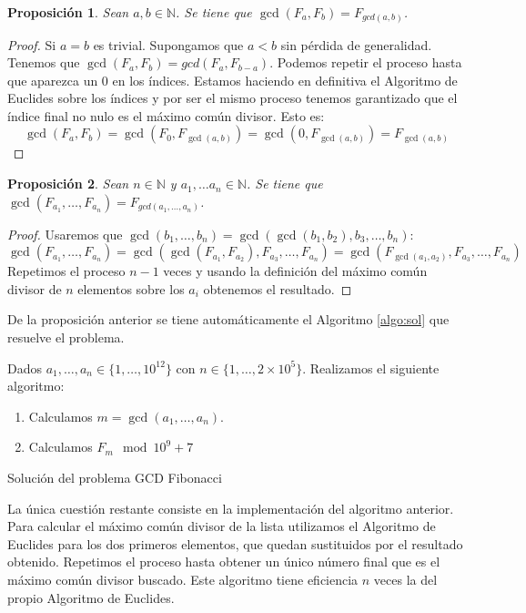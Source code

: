 \documentclass{article}
\theoremstyle{theorem-style}  %
\newtheorem{proposition}{Proposición}
\theoremstyle{definition}
\theoremstyle{example-style}
\begin{document}
    \begin{proposition}
        Sean $a, b \in \mathbb{N}$. Se tiene que $\gcd(F_a, F_b) = F_{gcd(a, b)}$. 
    \end{proposition}
    \begin{proof}
        Si $a=b$ es trivial. Supongamos que $a < b$ sin pérdida de generalidad.
        Tenemos que $\gcd(F_a, F_b) = gcd(F_a, F_{b-a})$. Podemos repetir el proceso hasta que aparezca un 0 en los índices. Estamos haciendo en definitiva el Algoritmo de Euclides sobre los índices y por ser el mismo proceso tenemos garantizado que el índice final no nulo es el máximo común divisor. Esto es:
        $$ \gcd(F_a, F_b) = \gcd(F_0, F_{\gcd(a,b)}) = \gcd(0, F_{\gcd(a,b)}) = F_{\gcd(a,b)} $$
    \end{proof}
    
    \begin{proposition}
        Sean $n \in \mathbb{N}$ y $a_1, \dots a_n \in \mathbb{N}$. Se tiene que 
        $\gcd(F_{a_1}, \dots, F_{a_n}) = F_{gcd(a_1, \dots, a_n)}$. 
    \end{proposition}
    \begin{proof}
        Usaremos que $\gcd(b_1, \dots, b_n) = \gcd( \gcd(b_1, b_2), b_3, \dots, b_n)$:
        $$ \gcd(F_{a_1}, \dots, F_{a_n}) = \gcd(\gcd(F_{a_1},F_{a_2}), F_{a_3}, \dots, F_{a_n}) = \gcd(F_{\gcd(a_1, a_2)}, F_{a_3}, \dots, F_{a_n}) $$
        Repetimos el proceso $n-1$ veces y usando la definición del máximo común divisor de $n$ elementos sobre los $a_i$ obtenemos el resultado.
    \end{proof}

    De la proposición anterior se tiene automáticamente el Algoritmo \ref{algo:sol} que resuelve el problema.
    
    \begin{algorithm}
        Dados $a_1, \dots, a_n \in \{1, \dots, 10^{12}\}$ con $n \in \{1, \dots, 2\times10^5\}$. Realizamos el siguiente algoritmo:
        \begin{enumerate}
            \item Calculamos $m = \gcd(a_1, \dots, a_n)$.
            \item Calculamos $F_m \mod 10^9+7$
        \end{enumerate}
        \caption{Solución del problema GCD Fibonacci}
        \label{algo:sol}
    \end{algorithm}

    La única cuestión restante consiste en la implementación del algoritmo anterior. Para calcular el máximo común divisor de la lista utilizamos el Algoritmo de Euclides para los dos primeros elementos, que quedan sustituidos por el resultado obtenido. Repetimos el proceso hasta obtener un único número final que es el máximo común divisor buscado. Este algoritmo tiene eficiencia $n$ veces la del propio Algoritmo de Euclides. 
    
\end{document}

